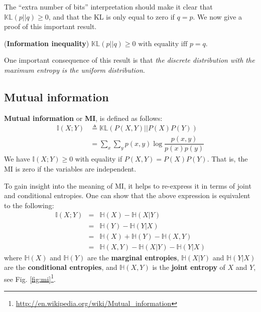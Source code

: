 \documentclass[graybox, envcountchap, twocolumn]{styles/svmult}
\begin{document}
The “extra number of bits” interpretation should make it clear that $\mathbb{KL}(p||q) \geq 0$, and that the KL is only equal to zero if $q = p$. We now give a proof of this important result.

\begin{theorem}
(\textbf{Information inequality}) $\mathbb{KL}(p||q) \geq 0 \text{ with equality iff } p=q$.
\end{theorem}

One important consequence of this result is that \emph{the discrete distribution with the maximum
entropy is the uniform distribution}.


\subsection{Mutual information}
\label{sec:Mutual-information}
\begin{definition}
\textbf{Mutual information} or \textbf{MI}, is defined as follows:
\begin{equation}\begin{split}
\mathbb{I}(X;Y) & \triangleq \mathbb{KL}(P(X,Y)||P(X)P(Y)) \\
    & =\sum\limits_x\sum\limits_yp(x,y)\log\dfrac{p(x,y)}{p(x)p(y)}
\end{split}\end{equation}
We have $\mathbb{I}(X;Y) \geq 0$ with equality if $P(X,Y)=P(X)P(Y)$. That is, the MI is zero if the variables are independent.
\end{definition}

To gain insight into the meaning of MI, it helps to re-express it in terms of joint and conditional entropies. One can show that the above expression is equivalent to the following:
\begin{eqnarray}
\mathbb{I}(X;Y)&=&\mathbb{H}(X)-\mathbb{H}(X|Y)\\
               &=&\mathbb{H}(Y)-\mathbb{H}(Y|X)\\
               &=&\mathbb{H}(X)+\mathbb{H}(Y)-\mathbb{H}(X,Y)\\
               &=&\mathbb{H}(X,Y)-\mathbb{H}(X|Y)-\mathbb{H}(Y|X)
\end{eqnarray}
where $\mathbb{H}(X)$ and $\mathbb{H}(Y)$ are the \textbf{marginal entropies}, $\mathbb{H}(X|Y)$ and $\mathbb{H}(Y|X)$ are the \textbf{conditional entropies}, and $\mathbb{H}(X,Y)$ is the \textbf{joint entropy} of $X$ and $Y$, see Fig. \ref{fig:mi}\footnote{\url{http://en.wikipedia.org/wiki/Mutual_information}}.
\end{document}
